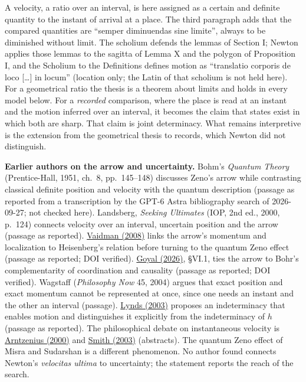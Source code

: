\documentclass[11pt,a4paper]{article}
\begin{document}
A velocity, a ratio over an interval, is here assigned as a certain and
definite quantity to the instant of arrival at a place. The third
paragraph adds that the compared quantities are ``semper diminuendas
sine limite'', always to be diminished without limit. The scholium
defends the lemmas of Section I; Newton applies those lemmas to the
sagitta of Lemma X and the polygon of Proposition I, and the Scholium to
the Definitions defines motion as ``translatio corporis de loco
{[}\ldots{]} in locum'' (location only; the Latin of that scholium is
not held here). For a geometrical ratio the thesis is a theorem about
limits and holds in every model below. For a \emph{recorded} comparison,
where the place is read at an instant and the motion inferred over an
interval, it becomes the claim that states exist in which both are
sharp. That claim is joint determinacy. What remains interpretive is the
extension from the geometrical thesis to records, which Newton did not
distinguish.

\textbf{Earlier authors on the arrow and uncertainty.} Bohm's
\emph{Quantum Theory} (Prentice-Hall, 1951, ch.~8, pp.~145--148)
discusses Zeno's arrow while contrasting classical definite position and
velocity with the quantum description (passage as reported from a
transcription by the GPT-6 Astra bibliography search of 2026-09-27; not
checked here). Landsberg, \emph{Seeking Ultimates} (IOP, 2nd ed., 2000,
p.~124) connects velocity over an interval, uncertain position and the
arrow (passage as reported).
\href{https://doi.org/10.1038/451137a}{Vaidman (2008)} links the arrow's
momentum and localization to Heisenberg's relation before turning to the
quantum Zeno effect (passage as reported; DOI verified).
\href{https://doi.org/10.1007/s10701-026-00922-0}{Goyal (2026)}, §VI.1,
ties the arrow to Bohr's complementarity of coordination and causality
(passage as reported; DOI verified). Wagstaff (\emph{Philosophy Now} 45,
2004) argues that exact position and exact momentum cannot be
represented at once, since one needs an instant and the other an
interval (passage). \href{https://doi.org/10.1023/A:1025361725408}{Lynds
(2003)} proposes an indeterminacy that enables motion and distinguishes
it explicitly from the indeterminacy of \(h\) (passage as reported). The
philosophical debate on instantaneous velocity is
\href{https://doi.org/10.5840/monist20008328}{Arntzenius (2000)} and
\href{https://doi.org/10.1016/S1355-2198(03)00007-8}{Smith (2003)}
(abstracts). The quantum Zeno effect of Misra and Sudarshan is a
different phenomenon. No author found connects Newton's \emph{velocitas
ultima} to uncertainty; the statement reports the reach of the search.
\end{document}
